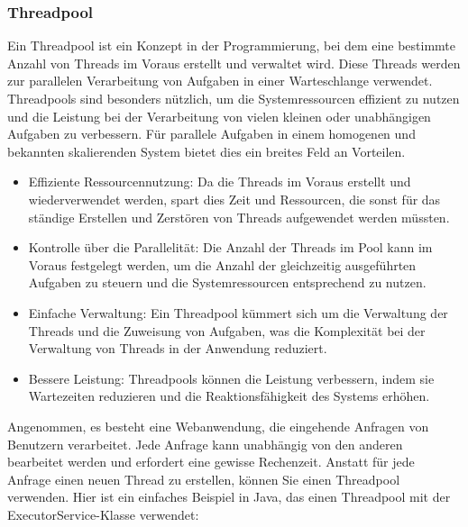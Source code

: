 \documentclass[../vs-script-first-v01.tex]{subfiles}
\begin{document}
\subsubsection{Threadpool}
Ein Threadpool ist ein Konzept in der Programmierung, bei dem eine bestimmte Anzahl von Threads im Voraus erstellt und verwaltet wird. Diese Threads werden zur parallelen Verarbeitung von Aufgaben in einer Warteschlange verwendet. Threadpools sind besonders nützlich, um die Systemressourcen effizient zu nutzen und die Leistung bei der Verarbeitung von vielen kleinen oder unabhängigen Aufgaben zu verbessern. Für parallele Aufgaben in einem homogenen und bekannten skalierenden System bietet dies ein breites Feld an Vorteilen. 
\begin{itemize}
\item Effiziente Ressourcennutzung: Da die Threads im Voraus erstellt und wiederverwendet werden, spart dies Zeit und Ressourcen, die sonst für das ständige Erstellen und Zerstören von Threads aufgewendet werden müssten.
\item Kontrolle über die Parallelität: Die Anzahl der Threads im Pool kann im Voraus festgelegt werden, um die Anzahl der gleichzeitig ausgeführten Aufgaben zu steuern und die Systemressourcen entsprechend zu nutzen.
\item Einfache Verwaltung: Ein Threadpool kümmert sich um die Verwaltung der Threads und die Zuweisung von Aufgaben, was die Komplexität bei der Verwaltung von Threads in der Anwendung reduziert.
\item Bessere Leistung: Threadpools können die Leistung verbessern, indem sie Wartezeiten reduzieren und die Reaktionsfähigkeit des Systems erhöhen.
\end{itemize}
Angenommen, es besteht eine Webanwendung, die eingehende Anfragen von Benutzern verarbeitet. Jede Anfrage kann unabhängig von den anderen bearbeitet werden und erfordert eine gewisse Rechenzeit. Anstatt für jede Anfrage einen neuen Thread zu erstellen, können Sie einen Threadpool verwenden. Hier ist ein einfaches Beispiel in Java, das einen Threadpool mit der ExecutorService-Klasse verwendet:\\\\
\end{document}
